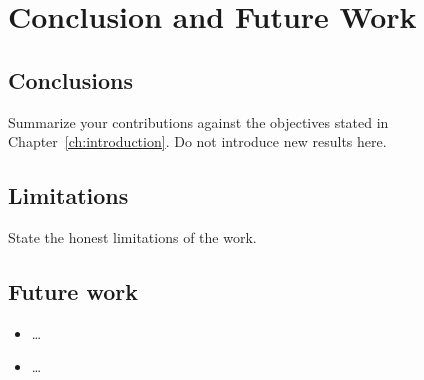 \chapter{Conclusion and Future Work}
\label{ch:conclusion}

\section{Conclusions}
Summarize your contributions against the objectives stated in
Chapter~\ref{ch:introduction}. Do not introduce new results here.

\section{Limitations}
State the honest limitations of the work.

\section{Future work}
\begin{itemize}
  \item \ldots
  \item \ldots
\end{itemize}

